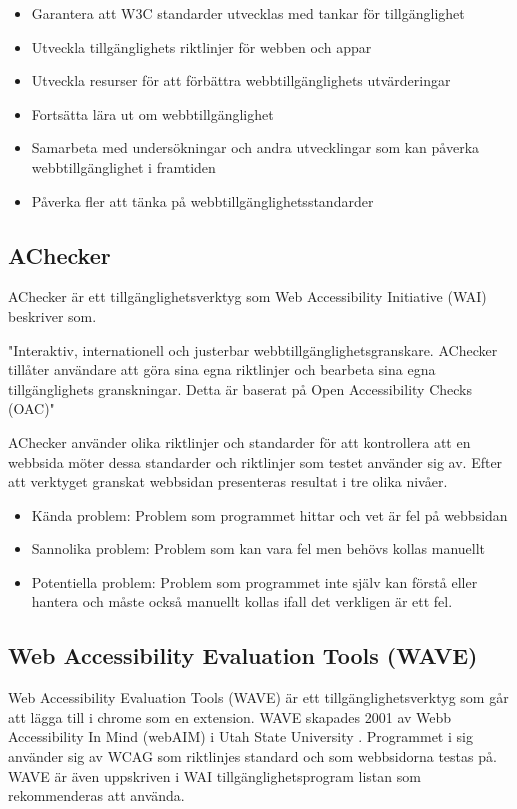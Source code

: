 \documentclass[11p]{article}
\begin{document}
    \begin{itemize}
        \item Garantera att W3C standarder utvecklas med tankar för tillgänglighet
        \item Utveckla tillgänglighets riktlinjer för webben och appar
        \item Utveckla resurser för att förbättra webbtillgänglighets utvärderingar
        \item Fortsätta lära ut om webbtillgänglighet
        \item Samarbeta med undersökningar och andra utvecklingar som kan påverka webbtillgänglighet i framtiden
        \item Påverka fler att tänka på webbtillgänglighetsstandarder
    \end{itemize}

    \textcite{WAI}
    
    \subsection{AChecker}
    AChecker är ett tillgänglighetsverktyg som Web Accessibility Initiative (WAI) beskriver som.

    "Interaktiv, internationell och justerbar webbtillgänglighetsgranskare.
    AChecker tillåter användare att göra sina egna riktlinjer och bearbeta sina egna tillgänglighets granskningar.
    Detta är baserat på Open Accessibility Checks (OAC)" \textcite{AChecker}

    AChecker använder olika riktlinjer och standarder för att kontrollera att en webbsida möter dessa standarder och riktlinjer som testet använder sig av.
    Efter att verktyget granskat webbsidan presenteras resultat i tre olika nivåer.

    \begin{itemize}
        \item Kända problem: Problem som programmet hittar och vet är fel på webbsidan
        \item Sannolika problem: Problem som kan vara fel men behövs kollas manuellt
        \item Potentiella problem: Problem som programmet inte själv kan förstå eller hantera och måste också manuellt kollas ifall det verkligen är ett fel.
    \end{itemize}
    
    \subsection{Web Accessibility Evaluation Tools (WAVE)}
    Web Accessibility Evaluation Tools (WAVE) är ett tillgänglighetsverktyg som går att lägga till i chrome som en extension.
    WAVE skapades 2001 av Webb Accessibility In Mind (webAIM) i Utah State University \textcite{WAVE}.
    Programmet i sig använder sig av WCAG som riktlinjes standard och som webbsidorna testas på.
    WAVE är även uppskriven i WAI tillgänglighetsprogram listan som rekommenderas att använda.
\end{document}
